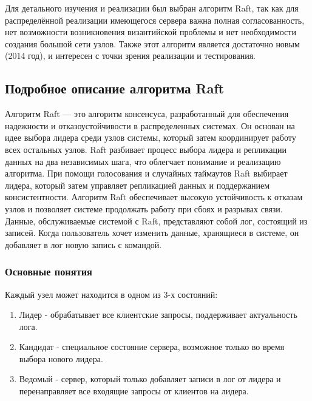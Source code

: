 \documentclass[subf, href, colorlinks=true, 14pt,
times, mtpro, specialist]{disser}
\theoremstyle{definition}
\begin{document}
Для детального изучения и реализации был выбран алгоритм Raft, так как для распределённой реализации имеющегося сервера важна полная согласованность, нет возможности возникновения византийской проблемы и нет необходимости создания большой сети узлов. Также этот алгоритм является достаточно новым (2014 год), и интересен с точки зрения реализации и тестирования. 

\newpage
\subsection{Подробное описание алгоритма Raft}

Алгоритм Raft --- это алгоритм консенсуса, разработанный для обеспечения надежности и отказоустойчивости в распределенных системах. Он основан на идее выбора лидера среди узлов системы, который затем координирует работу всех остальных узлов. Raft разбивает процесс выбора лидера и репликации данных на два независимых шага, что облегчает понимание и реализацию алгоритма. При помощи голосования и случайных таймаутов Raft выбирает лидера, который затем управляет репликацией данных и поддержанием консистентности. Алгоритм Raft обеспечивает высокую устойчивость к отказам узлов и позволяет системе продолжать работу при сбоях и разрывах связи.
Данные, обслуживаемые системой с Raft, представляют собой лог, состоящий из записей. Когда пользователь хочет изменить данные, хранящиеся в системе, он добавляет в лог новую запись с командой.

\subsubsection{Основные понятия}

Каждый узел может находится в одном из 3-х состояний:
\begin{enumerate}%
\item Лидер - обрабатывает все клиентские запросы, поддерживает актуальность лога.
\item Кандидат - специальное состояние сервера, возможное только во время выбора нового лидера.
\item Ведомый - сервер, который только добавляет записи в лог от лидера и перенаправляет все входящие запросы от клиентов на лидера.\
\end{enumerate}

\newpage
\end{document}
